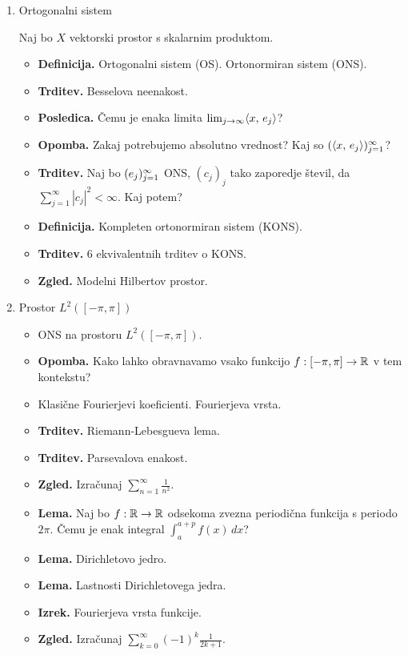 \begin{enumerate}
    \item Ortogonalni sistem
    
    Naj bo \(X\) vektorski prostor s skalarnim produktom.
    \begin{itemize}
        \item \textbf{Definicija.} Ortogonalni sistem (OS). Ortonormiran sistem (ONS).
        \item \textbf{Trditev.} Besselova neenakost. \todo{*}
        \item \textbf{Posledica.} Čemu je enaka limita \(\lim_{j \to \infty} \langle x, \, e_j \rangle\)?
        \item \textbf{Opomba.} Zakaj potrebujemo absolutno vrednost? Kaj so \((\langle x, \, e_j \rangle)_{j=1}^\infty\)?
        \item \textbf{Trditev.} Naj bo \((e_j)_{j=1}^\infty\) ONS, \((c_j)_j\) tako zaporedje števil, da \(\sum_{j=1}^{\infty} |c_j|^2 < \infty\). Kaj potem?
        \item \textbf{Definicija.} Kompleten ortonormiran sistem (KONS).
        \item \textbf{Trditev.} 6 ekvivalentnih trditev o KONS. \todo{*}
        \item \textbf{Zgled.} Modelni Hilbertov prostor.  
    \end{itemize}

    \item Prostor \(L^2([-\pi, \pi])\)
    \begin{itemize}
        \item ONS na prostoru \(L^2([-\pi, \pi])\). 
        \item \textbf{Opomba.} Kako lahko obravnavamo vsako funkcijo \(f: [-\pi, \pi] \to \mathbb{R}\) v tem kontekstu?
        \item Klasične Fourierjevi koeficienti. Fourierjeva vrsta. \todo{*}
        \item \textbf{Trditev.} Riemann-Lebesgueva lema.
        \item \textbf{Trditev.} Parsevalova enakost.
        \item \textbf{Zgled.} Izračunaj \(\sum_{n=1}^{\infty} \frac{1}{n^2}\).
        \item \textbf{Lema.} Naj bo \(f: \mathbb{R} \to \mathbb{R}\) odsekoma zvezna periodična funkcija s periodo \(2\pi\). Čemu je enak integral \(\int_{a}^{a+p} f(x) \, dx\)?
        \item \textbf{Lema.} Dirichletovo jedro.
        \item \textbf{Lema.} Lastnosti Dirichletovega jedra.
        \item \textbf{Izrek.} Fourierjeva vrsta funkcije. \todo{*}
        \item \textbf{Zgled.} Izračunaj \(\sum_{k=0}^{\infty}(-1)^{k}\frac{1}{2k+1}\).
    \end{itemize}
\end{enumerate}